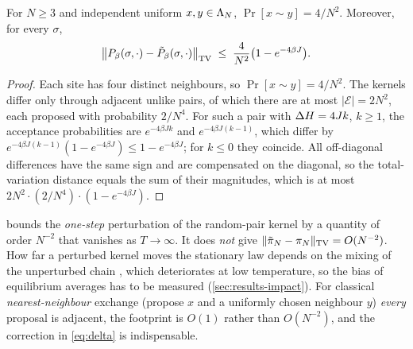 \begin{proposition}\label{prop:footprint}
For $N\ge3$ and independent uniform $x,y\in\Lambda_N$, $\Pr[x\sim y]=4/N^2$. Moreover, for every $\sigma$,
\begin{equation}
\big\|P_\beta(\sigma,\cdot)-\tilde P_\beta(\sigma,\cdot)\big\|_{\mathrm{TV}}\;\le\;\frac{4}{N^{2}}\big(1-e^{-4\beta J}\big).
\label{eq:footprint}
\end{equation}
\end{proposition}
\begin{proof}
Each site has four distinct neighbours, so $\Pr[x\sim y]=4/N^2$. The kernels differ only through adjacent unlike pairs, of which there are at most $|\mathcal E|=2N^2$, each proposed with probability $2/N^4$. For such a pair with $\Delta H=4Jk$, $k\ge1$, the acceptance probabilities are $e^{-4\beta Jk}$ and $e^{-4\beta J(k-1)}$, which differ by $e^{-4\beta J(k-1)}(1-e^{-4\beta J})\le 1-e^{-4\beta J}$; for $k\le0$ they coincide. All off-diagonal differences have the same sign and are compensated on the diagonal, so the total-variation distance equals the sum of their magnitudes, which is at most $2N^2\cdot(2/N^4)\cdot(1-e^{-4\beta J})$.
\end{proof}
\begin{remark}
 bounds the \emph{one-step} perturbation of the random-pair kernel by a quantity of order $N^{-2}$ that vanishes as $T\to\infty$. It does \emph{not} give $\|\tilde\pi_N-\pi_N\|_{\mathrm{TV}}=O(N^{-2})$. How far a perturbed kernel moves the stationary law depends on the mixing of the unperturbed chain \citep{mitrophanov2005}, which deteriorates at low temperature, so the bias of equilibrium averages has to be measured (\cref{sec:results-impact}). For classical \emph{nearest-neighbour} exchange (propose $x$ and a uniformly chosen neighbour $y$) \emph{every} proposal is adjacent, the footprint is $O(1)$ rather than $O(N^{-2})$, and the correction in \eqref{eq:delta} is indispensable.
\end{remark}

